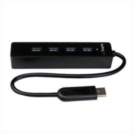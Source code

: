 \documentclass[user_manual.tex]{subfiles}
\begin{document}
\begin{center}
\includegraphics[width=0.5\textwidth]{Figures/Hardware/Partes/ST4300PBU3.jpg}
\label{fig:Hardware:Partes:HUBST}
\end{center}
\end{document}
